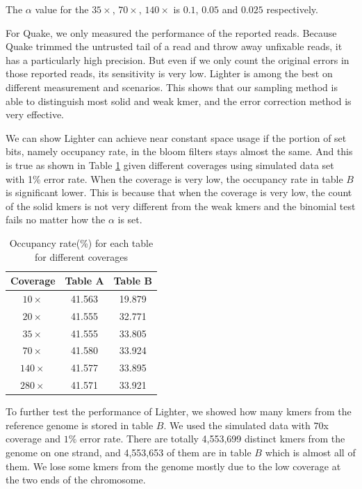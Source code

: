 \documentclass[10pt]{article}
\begin{document}
The $\alpha$ value for the $35\times$, $70\times$, $140\times$ is $0.1$, $0.05$ and $0.025$ respectively. 

For Quake, we only measured the performance of the reported reads. Because Quake trimmed the untrusted tail of a read and throw away unfixable reads, it has a particularly high precision. But even if we only count the original errors in those reported reads, its sensitivity is very low. Lighter is among the best on different measurement and scenarios. This shows that our sampling method is able to distinguish most solid and weak kmer, and the error correction method is very effective.

We can show Lighter can achieve near constant space usage if the portion of set bits, namely occupancy rate, in the bloom filters stays almost the same. And this is true as shown in Table \ref{table:bloom_occupancy_coverage} given different coverages using simulated data set with 1\% error rate. When the coverage is very low, the occupancy rate in table $B$ is significant lower. This is because that when the coverage is very low, the count of the solid kmers is not very different from the weak kmers and the binomial test fails no matter how the $\alpha$ is set.

\begin{table}
\begin{tabular}{|c|c|c|}\hline
Coverage & Table A & Table B \\ \hline
$10\times$	& 41.563  &	19.879 \\ \hline
$20\times$	& 41.555  &	32.771 \\ \hline
$35\times$ & 41.555	& 33.805 \\ \hline
$70\times$ & 41.580	& 33.924 \\ \hline
$140\times$ & 41.577 & 33.895  \\ \hline
$280\times$ & 41.571 & 33.921 \\ \hline
\end{tabular}
\caption{Occupancy rate(\%) for each table for different coverages\label{table:bloom_occupancy_coverage}}
\end{table}

To further test the performance of Lighter, we showed how many kmers from the reference genome is stored in table $B$. We used the simulated data with $70$x coverage and $1\%$ error rate. There are totally 4,553,699 distinct kmers from the genome on one strand, and 4,553,653 of them are in table $B$ which is almost all of them. We lose some kmers from the genome mostly due to the low coverage at the two ends of the chromosome.
\end{document}

